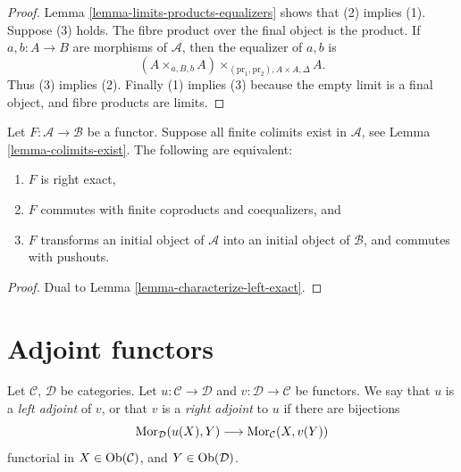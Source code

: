 \begin{proof}
Lemma \ref{lemma-limits-products-equalizers} shows that (2) implies (1).
Suppose (3) holds. The fibre product over the final object is the product.
If $a, b : A \to B$ are morphisms of $\mathcal{A}$, then the
equalizer of $a, b$ is
$$
(A \times_{a, B, b} A)\times_{(\text{pr}_1, \text{pr}_2), A \times A, \Delta} A.
$$
Thus (3) implies (2). Finally (1) implies (3) because
the empty limit is a final object, and fibre products are limits.
\end{proof}

\begin{lemma}
\label{lemma-characterize-right-exact}
Let $F : \mathcal{A} \to \mathcal{B}$ be a functor.
Suppose all finite colimits exist in $\mathcal{A}$,
see Lemma \ref{lemma-colimits-exist}.
The following are equivalent:
\begin{enumerate}
\item $F$ is right exact,
\item $F$ commutes with finite coproducts and coequalizers, and
\item $F$ transforms an initial object of $\mathcal{A}$
into an initial object of $\mathcal{B}$, and commutes with pushouts.
\end{enumerate}
\end{lemma}

\begin{proof}
Dual to Lemma \ref{lemma-characterize-left-exact}.
\end{proof}




\section{Adjoint functors}
\label{section-adjoint}

\begin{definition}
\label{definition-adjoint}
Let $\mathcal{C}$, $\mathcal{D}$ be categories.
Let $u : \mathcal{C} \to \mathcal{D}$ and
$v : \mathcal{D} \to \mathcal{C}$ be functors.
We say that $u$ is a {\it left adjoint} of $v$, or that
$v$ is a {\it right adjoint} to $u$ if there are bijections
$$
\mathop{\mathrm{Mor}}\nolimits_\mathcal{D}(u(X), Y)
\longrightarrow
\mathop{\mathrm{Mor}}\nolimits_\mathcal{C}(X, v(Y))
$$
functorial in $X \in \mathop{\mathrm{Ob}}\nolimits(\mathcal{C})$, and
$Y \in \mathop{\mathrm{Ob}}\nolimits(\mathcal{D})$.
\end{definition}

